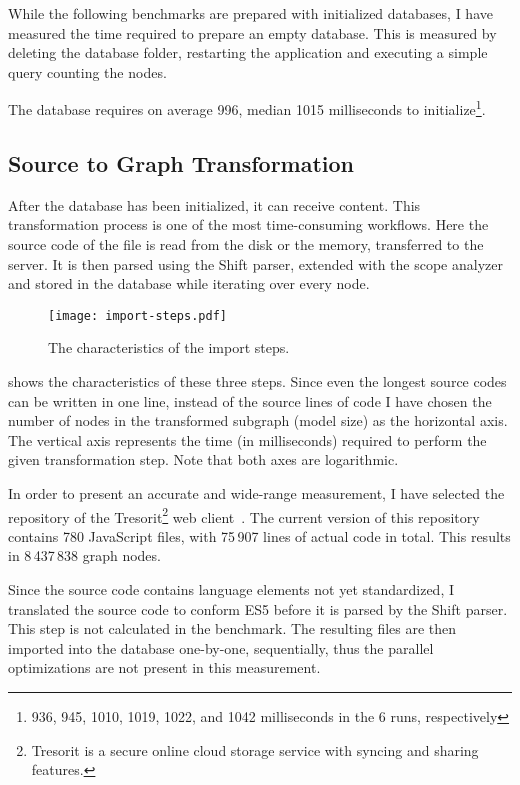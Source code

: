 While the following benchmarks are prepared with initialized databases, I have measured the time required to prepare an empty database. This is measured by deleting the database folder, restarting the application and executing a simple query counting the nodes.

The database requires on average 996, median 1015 milliseconds to initialize\footnote{936, 945, 1010, 1019, 1022, and 1042 milliseconds in the 6 runs, respectively}.

\subsection{Source to Graph Transformation}
After the database has been initialized, it can receive content. This transformation process is one of the most time-consuming workflows. Here the source code of the file is read from the disk or the memory, transferred to the server. It is then parsed using the Shift parser, extended with the scope analyzer and stored in the database while iterating over every node.

\begin{figure}[!htb]
  \centering
  \texttt{[image: import-steps.pdf]}
  \caption{The characteristics of the import steps.}
  \label{fig:import-steps}
\end{figure}

 shows the characteristics of these three steps. Since even the longest source codes can be written in one line, instead of the source lines of code I have chosen the number of nodes in the transformed subgraph (model size) as the horizontal axis. The vertical axis represents the time (in milliseconds) required to perform the given transformation step. Note that both axes are logarithmic.

In order to present an accurate and wide-range measurement, I have selected the repository of the Tresorit\footnote{Tresorit is a secure online cloud storage service with syncing and sharing features.} web client~\cite{tresorit-webclient}. The current version of this repository contains 780 JavaScript files, with 75\,907 lines of actual code in total. This results in 8\,437\,838 graph nodes.

Since the source code contains language elements not yet standardized, I translated the source code to conform ES5 before it is parsed by the Shift parser. This step is not calculated in the benchmark. The resulting files are then imported into the database one-by-one, sequentially, thus the parallel optimizations are not present in this measurement.

